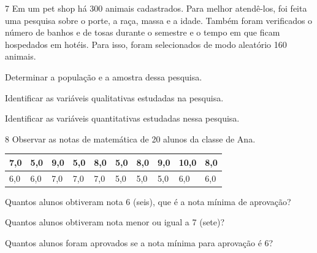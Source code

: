 \num{7} Em um pet shop há 300 animais cadastrados. Para melhor atendê-los,
foi feita uma pesquisa sobre o porte, a raça, massa e a idade. Também
foram verificados o número de banhos e de tosas durante o semestre e o
tempo em que ficam hospedados em hotéis. Para isso, foram selecionados
de modo aleatório 160 animais.

\begin{escolha}
\item
  Determinar a população e a amostra dessa pesquisa.


\item
  Identificar as variáveis qualitativas estudadas na pesquisa.


\item
  Identificar as variáveis quantitativas estudadas nessa pesquisa.

\end{escolha}


\num{8} Observar as notas de matemática de 20 alunos da classe de Ana.

\begin{longtable}[]{@{}llllllllll@{}}
\toprule
7,0 & 5,0 & 9,0 & 5,0 & 8,0 & 5,0 & 8,0 & 9,0 & 10,0 &
8,0\tabularnewline
\midrule
\endhead
6,0 & 6,0 & 7,0 & 7,0 & 7,0 & 5,0 & 5,0 & 5,0 & 6,0 & 6,0\tabularnewline
\bottomrule
\end{longtable}

\begin{escolha}
\item
  Quantos alunos obtiveram nota 6 (seis), que é a nota mínima de aprovação?


\item
  Quantos alunos obtiveram nota menor ou igual a 7 (sete)?


\item
  Quantos alunos foram aprovados se a nota mínima para aprovação é 6?

\end{escolha}


